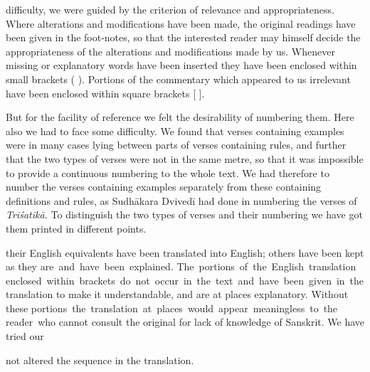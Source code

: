 \documentclass[10pt, openany]{book}
\begin{document}
\newpage

{difficulty, we were guided by the criterion of relevance and}
{appropriateness. Where alterations and modifications have}
{been made, the original readings have been given in the foot-notes,}
{so that the interested reader may himself decide the}
{appropriateness of the alterations and modifications made by}
{us. Whenever missing or explanatory words have been inserted}
{they have been enclosed within small brackets ( ).}
{Portions of the commentary which appeared to us irrelevant}
{have been enclosed within square brackets [ ].}

\vspace{0.3cm}{The verses of the text were not numbered in the manuscript.}
{But for the facility of reference we felt the desirability}
{of numbering them. Here also we had to face some difficulty.}
{We found that verses containing examples were in many cases}
{lying between parts of verses containing rules, and further}
{that the two types of verses were not in the same metre, so}
{that it was impossible to provide a continuous numbering to}
{the whole text. We had therefore to number the verses containing}
{examples separately from these containing definitions}
{and rules, as Sudhākara Dvivedī had done in numbering the}
{verses of \textit{Triśatikā.} To distinguish the two types of}
{verses and their numbering we have got them printed in}
{different points.}

{their English equivalents have been translated into English;}
{others have been kept as they are \,and \,have \,been \,explained.}
{The \,portions \,of \,the \,English \,translation \,enclosed \,within \,brackets \,do \,not \,occur \,in \,the \,text \,and \,have \,been \,given \,in \,the}
{translation to make it understandable, and are at places explanatory.}
{Without these portions \,the \,translation \,at \,places \,would \,appear \,meaningless \,to \,the \,reader \,who cannot consult the}
{original for  lack of knowledge of Sanskrit. We have tried our}

\newpage

{not altered the sequence in the translation.}
\end{document}
